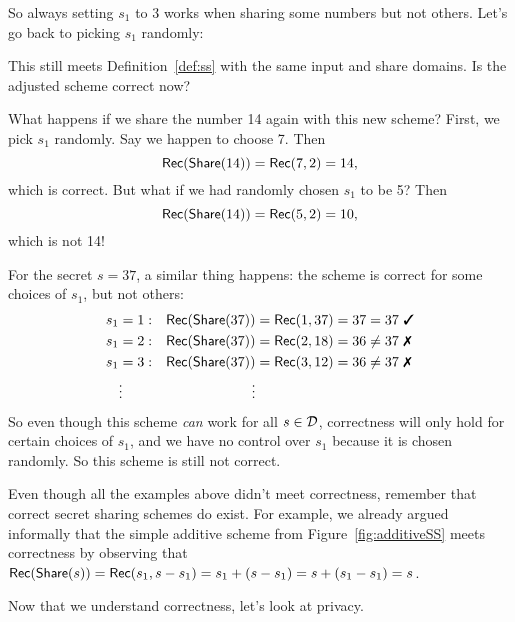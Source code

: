 \begin{example}\label{ex:floor}
    So always setting $s_1$ to 3 works when sharing some numbers but not 
    others. Let's go back to picking $s_1$ randomly:
    \begin{pchstack}[center]
    \pchspace
    \end{pchstack}
    This still meets Definition~\ref{def:ss} with the same input and share 
    domains. Is the adjusted scheme correct now?

    What happens if we share the number 14 again with this new scheme? First, we pick $s_1$ randomly.
    Say we happen to choose 7. Then 
    \[
        \mathsf{Rec}(\mathsf{Share}(14)) = \mathsf{Rec}(7, 2) = 14,
    \]
    which is correct. But what if we had randomly chosen $s_1$ to be 
    5? Then 
    \[
        \mathsf{Rec}(\mathsf{Share}(14)) = \mathsf{Rec}(5, 2) = 10,
    \]
    which is not 14!

    For the secret $s=37$, a similar thing happens: the scheme is correct for some 
    choices of $s_1$, but not others:
    \begin{align*}
        s_1 &= 1: &\rec(\share(37)) &= \rec(1, 37) = 37 = 37~\text{\cmark}\\
        s_1 &= 2: &\rec(\share(37)) &= \rec(2, 18) = 36 \neq 37~\text{\xmark}\\
        s_1 &= 3: &\rec(\share(37)) &= \rec(3, 12) = 36 \neq 37~\text{\xmark}\\
        &\vdots   &\vdots &
    \end{align*}
    So even though this scheme \emph{can} work for all $s \in \mathcal{D}$, correctness 
    will only hold for certain choices of $s_1$, and we have no control over 
    $s_1$ because it is chosen randomly. So this scheme is still not correct. 
\end{example}

Even though all the examples above didn't meet correctness, remember that
correct secret sharing schemes do exist. For example, we already argued informally that 
the simple additive scheme from Figure~\ref{fig:additiveSS} meets correctness
by observing that $\mathsf{Rec}(\mathsf{Share}(s)) = \mathsf{Rec}(s_1, s-s_1) = s_1 + 
(s-s_1) = s + (s_1-s_1) = s$.

Now that we understand correctness, let's look at privacy.

